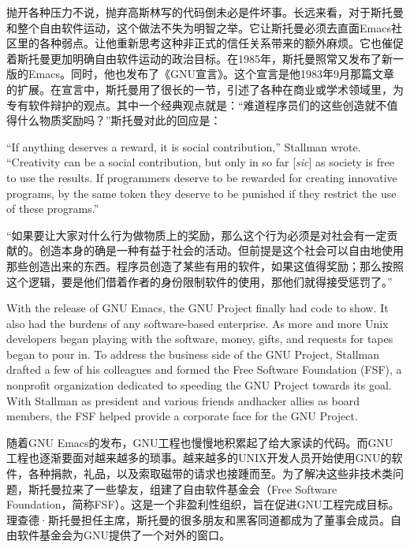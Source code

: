 \ifdefined\chs
抛开各种压力不说，抛弃高斯林写的代码倒未必是件坏事。长远来看，对于斯托曼和整个自由软件运动，这个做法不失为明智之举。它让斯托曼必须去直面Emacs社区里的各种弱点。让他重新思考这种非正式的信任关系带来的额外麻烦。它也催促着斯托曼更加明确自由软件运动的政治目标。在1985年，斯托曼照常又发布了新一版的Emacs。同时，他也发布了《GNU宣言》。这个宣言是他1983年9月那篇文章的扩展。在宣言中，斯托曼用了很长的一节，引述了各种在商业或学术领域里，为专有软件辩护的观点。其中一个经典观点就是：``难道程序员们的这些创造就不值得什么物质奖励吗？''斯托曼对此的回应是：
\fi

\ifdefined\eng
``If anything deserves a reward, it is social contribution,'' Stallman wrote. ``Creativity can be a social contribution, but only in so far [\textit{sic}] as society is free to use the results. If programmers deserve to be rewarded for creating innovative programs, by the same token they deserve to be punished if they restrict the use of these programs.''
\fi

\ifdefined\chs
``如果要让大家对什么行为做物质上的奖励，那么这个行为必须是对社会有一定贡献的。创造本身的确是一种有益于社会的活动。但前提是这个社会可以自由地使用那些创造出来的东西。程序员创造了某些有用的软件，如果这值得奖励；那么按照这个逻辑，要是他们借着作者的身份限制软件的使用，那他们就得接受惩罚了。''
\fi

\ifdefined\eng
With the release of GNU Emacs, the GNU Project finally had code to show. It also had the burdens of any software-based enterprise. As more and more Unix developers began playing with the software, money, gifts, and requests for tapes began to pour in. To address the business side of the GNU Project, Stallman drafted a few of his colleagues and formed the Free Software Foundation (FSF), a nonprofit organization dedicated to speeding the GNU Project towards its goal. With Stallman as president and various \ifdefined\vtwo friends and\fi hacker allies as board members, the FSF helped provide a corporate face for the GNU Project.
\fi

\ifdefined\chs
随着GNU Emacs的发布，GNU工程也慢慢地积累起了给大家读的代码。而GNU工程也逐渐要面对越来越多的琐事。越来越多的UNIX开发人员开始使用GNU的软件，各种捐款，礼品，以及索取磁带的请求也接踵而至。为了解决这些非技术类问题，斯托曼拉来了一些挚友，组建了自由软件基金会（Free Software Foundation，简称FSF）。这是一个非盈利性组织，旨在促进GNU工程完成目标。理查德·斯托曼担任主席，斯托曼的很多朋友和黑客同道都成为了董事会成员。自由软件基金会为GNU提供了一个对外的窗口。
\fi

